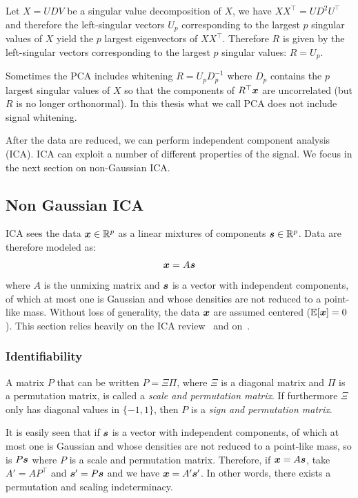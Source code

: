 Let $X = UDV$ be a singular value decomposition of $X$, we have $XX^{\top}= U
D^2 U^{\top}$ and therefore the left-singular vectors $U_p$ corresponding to the
largest $p$ singular values of $X$ yield  the $p$ largest eigenvectors of
$XX^{\top}$. Therefore $R$ is given by the left-singular vectors corresponding
to the largest $p$ singular values: $R=U_p$.

Sometimes the PCA includes whitening $R = U_p D_p^{-1}$ where $D_p$ contains the
 $p$ largest singular values of $X$ so that the components of $R^{\top} \boldsymbol{x}$ are
uncorrelated (but $R$ is no longer orthonormal). In this thesis what we call PCA
does not include signal whitening.

After the data are reduced, we can perform independent component analysis (ICA).
ICA can exploit a number of different properties of the signal. We focus in the
next section on non-Gaussian ICA.

\subsection{Non Gaussian ICA}
ICA sees the data $\boldsymbol{x} \in \mathbb{R}^p$ as a linear mixtures of components $\boldsymbol{s} \in \mathbb{R}^p$.
Data are therefore modeled as:
\begin{align}
  \boldsymbol{x} = A \boldsymbol{s}
\end{align}
where $A$ is the unmixing matrix and $\boldsymbol{s}$ is a vector with independent components, of which at most one is Gaussian and whose densities are not reduced to a point-like mass.
Without loss of generality, the data $\boldsymbol{x}$ are assumed centered ($\mathbb{E}[\boldsymbol{x}] = 0$).
This section relies heavily on the ICA review~\cite{hyvarinen2000independent}
and on~\cite{cardoso1997infomax}.

\subsubsection{Identifiability}
A matrix $P$ that can be written $P =
\Xi \Pi$, where $\Xi$ is a diagonal matrix and $\Pi$ is a permutation matrix, is
called a \emph{scale and permutation matrix}. If furthermore $\Xi$ only has
diagonal
values in $\{-1, 1\}$, then $P$ is a \emph{sign and permutation matrix}.

It is easily seen that if $\boldsymbol{s}$ is a vector with independent components, of
which at most one is Gaussian and whose densities are not reduced to a
point-like mass, so is $P \boldsymbol{s}$ where $P$ is a scale and permutation matrix.
Therefore, if $\boldsymbol{x} = A \boldsymbol{s}$, take $A' = AP^{\top}$ and $\boldsymbol{s}'=P\boldsymbol{s}$ and we have
$\boldsymbol{x} = A' \boldsymbol{s}'$.
In other words, there exists a permutation and scaling indeterminacy.

